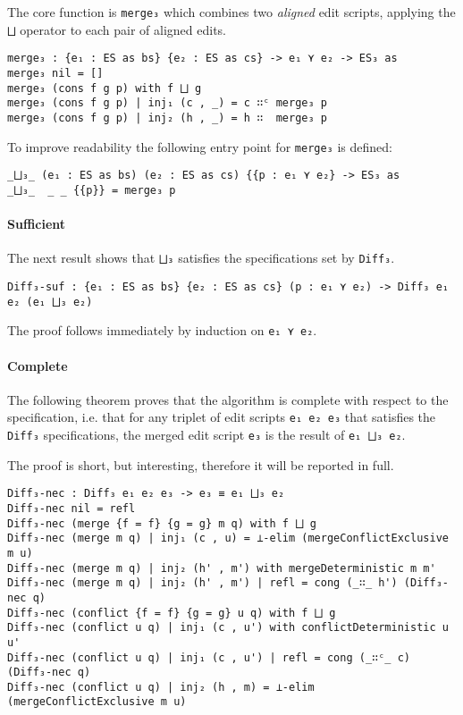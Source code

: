 \documentclass[../Thesis.tex]{subfiles}
\begin{document}
	The core function is \texttt{merge₃} which combines two 
	\emph{aligned} edit scripts, applying the \texttt{⨆} operator to
	each pair of aligned edits. 
\begin{verbatim}
merge₃ : {e₁ : ES as bs} {e₂ : ES as cs} -> e₁ ⋎ e₂ -> ES₃ as
merge₃ nil = []
merge₃ (cons f g p) with f ⨆ g
merge₃ (cons f g p) | inj₁ (c , _) = c ∷ᶜ merge₃ p
merge₃ (cons f g p) | inj₂ (h , _) = h ∷  merge₃ p
\end{verbatim}
	
	To improve readability the following entry point for \texttt{merge₃} is
	defined:
\begin{verbatim}
_⨆₃_ (e₁ : ES as bs) (e₂ : ES as cs) {{p : e₁ ⋎ e₂} -> ES₃ as
_⨆₃_  _ _ {{p}} = merge₃ p
\end{verbatim}
	
	\paragraph{Sufficient}
	The next result shows that \texttt{⨆₃} satisfies
	the specifications set by \texttt{Diff₃}.
	
\begin{verbatim}
Diff₃-suf : {e₁ : ES as bs} {e₂ : ES as cs} (p : e₁ ⋎ e₂) -> Diff₃ e₁ e₂ (e₁ ⨆₃ e₂)
\end{verbatim}
	The proof follows immediately by induction 
	on \texttt{e₁ ⋎ e₂}.

	\paragraph{Complete}
	The following theorem proves that the algorithm is
	complete with respect to the specification, i.e. that
	for any triplet of edit scripts \texttt{e₁ e₂ e₃} that satisfies 
	the \texttt{Diff₃} specifications, the merged
	edit script \texttt{e₃} is the result of \texttt{e₁ ⨆₃ e₂}.
	
	The proof is short, but interesting, therefore it will
	be reported in full.
	
\begin{verbatim}
Diff₃-nec : Diff₃ e₁ e₂ e₃ -> e₃ ≡ e₁ ⨆₃ e₂
Diff₃-nec nil = refl
Diff₃-nec (merge {f = f} {g = g} m q) with f ⨆ g
Diff₃-nec (merge m q) | inj₁ (c , u) = ⊥-elim (mergeConflictExclusive m u)
Diff₃-nec (merge m q) | inj₂ (h' , m') with mergeDeterministic m m'
Diff₃-nec (merge m q) | inj₂ (h' , m') | refl = cong (_∷_ h') (Diff₃-nec q)
Diff₃-nec (conflict {f = f} {g = g} u q) with f ⨆ g
Diff₃-nec (conflict u q) | inj₁ (c , u') with conflictDeterministic u u'
Diff₃-nec (conflict u q) | inj₁ (c , u') | refl = cong (_∷ᶜ_ c) (Diff₃-nec q)
Diff₃-nec (conflict u q) | inj₂ (h , m) = ⊥-elim (mergeConflictExclusive m u)	
\end{verbatim}
\end{document}
